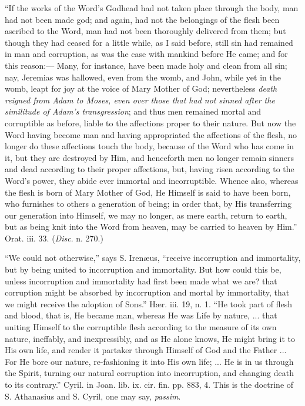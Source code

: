 ``If
the works of the Word's Godhead had not taken place through the body,
man had not been made god; and again, had not the belongings of the
flesh been ascribed to the Word, man had not been thoroughly delivered
from them; but though they had ceased for a little while, as I said
before, still sin had remained in man and corruption, as was the case
with mankind before He came; and for this reason:— Many,
for instance, have been made holy and clean from all sin; nay,
Jeremias was hallowed, even from the womb, and John, while yet in the
womb, leapt for joy at the voice of Mary Mother of God; nevertheless \emph{death reigned from Adam to Moses, even over those that had not sinned
after the similitude of Adam's transgression}; and thus men
remained mortal and corruptible as before, liable to the affections
proper to their nature. But now the Word having become man and having
appropriated the affections of the flesh, no longer do these
affections touch the body, because of the Word who has come in it, but
they are destroyed by Him, and henceforth men no longer remain sinners
and dead according to their proper affections, but, having risen
according to the Word's power, they abide ever immortal and
incorruptible. Whence also, whereas the flesh is born of Mary Mother
of God, He Himself is said to have been born, who furnishes to others
a generation of being; in order that, by His transferring our
generation into Himself, we may no longer, as mere earth, return to
earth, but as being knit into the Word from heaven, may be carried to
heaven by Him.'' Orat. iii. 33. (\emph{Disc}. n. 270.)

``We could not otherwise,'' says S. Irenæus, ``receive
incorruption and immortality, but by being united to incorruption and
immortality. But how could this be, unless incorruption and
immortality had first been made what we are? that corruption might be
absorbed by incorruption and mortal by immortality, that we might
receive the adoption of Sons.'' Hær. iii. 19, n. 1. ``He took part of
flesh and blood, that is, He became man, whereas He was Life by
nature, ... that uniting Himself to the corruptible flesh according to
the measure of its own nature, ineffably, and inexpressibly, and as He
alone knows, He might bring it to His own life, and render it partaker
through Himself of God and the Father ... For He bore our nature,
re-fashioning it into His own life; ... He is in us through the
Spirit, turning our natural corruption into incorruption, and changing
death to its contrary.'' Cyril. in Joan. lib. ix. cir. fin. pp. 883, 4.
This is the doctrine of S. Athanasius and S. Cyril, one may say, \emph{passim}.

